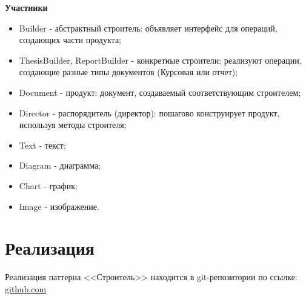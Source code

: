 \documentclass[PI,LAB]{HSEUniversity}
\begin{document}
\textbf{Участники}
\begin{itemize}
  \item Builder - абстрактный строитель: объявляет интерфейс для операций, создающих части продукта;
  \item ThesisBuilder, ReportBuilder - конкретные строители: реализуют операции, создающие разные типы документов (Курсовая или отчет);
  \item Document - продукт: документ, создаваемый соответствующим строителем;
  \item Director - распорядитель (директор): пошагово конструирует продукт, используя методы строителя;
  \item Text - текст;
  \item Diagram - диаграмма;
  \item Chart - график;
  \item Image - изображение.
\end{itemize}

\section{Реализация}
Реализация паттерна <<Строитель>> находится в git-репозитории по ссылке: \href{https://github.com/rovany706/design-patterns/tree/master/Builder/src/com/Builder}{github.com}
\end{document}

